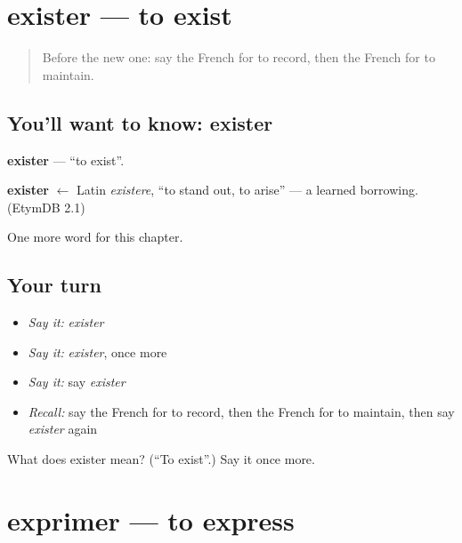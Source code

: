 \section[exister]{exister — to exist}

\label{lesson:FR-C214-exister}



\begin{quote}
Before the new one: say the French for to record, then the French for to maintain.
\end{quote}

\subsection*{You'll want to know: exister}
\textbf{exister} — \textquotedblleft{}to exist\textquotedblright{}.

\begin{cousinweb}
\textbf{exister} $\leftarrow$ Latin \emph{existere}, \textquotedblleft{}to stand out, to arise\textquotedblright{} — a learned borrowing. (EtymDB 2.1)
\end{cousinweb}

\begin{grammarlens}[title={What you've built}]
One more word for this chapter.
\end{grammarlens}

\subsection*{Your turn}
\begin{itemize}
\raggedright
  \item \emph{Say it:} \emph{exister}
  \item \emph{Say it:} \emph{exister}, once more
  \item \emph{Say it:} say \emph{exister}
  \item \emph{Recall:} say the French for to record, then the French for to maintain, then say \emph{exister} again
\end{itemize}

\begin{tcolorbox}[breakable,colback=teal!4,colframe=teal!35!black,title={Before you move on}]
What does exister mean? (\textquotedblleft{}To exist\textquotedblright{}.) Say it once more.
\end{tcolorbox}
\section[exprimer]{exprimer — to express}

